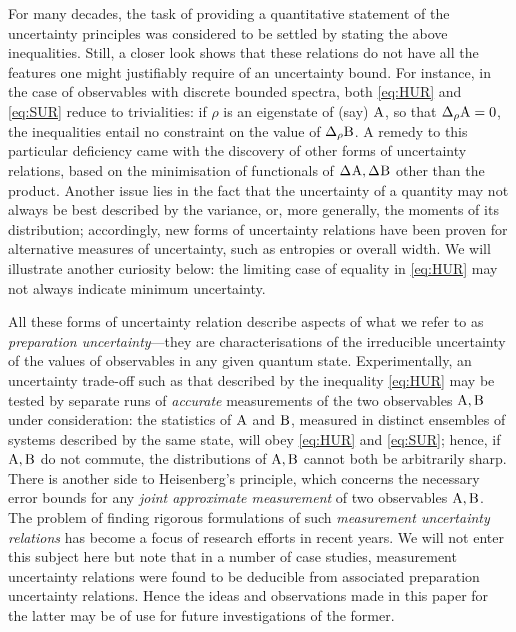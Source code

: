 For many decades, the task of providing a quantitative statement of the uncertainty principles was considered to be settled by stating the above inequalities.
Still, a closer look shows that these relations do not have all the features one might justifiably require of an uncertainty bound. For instance, in the case of observables with discrete bounded spectra, both \eqref{eq:HUR} and \eqref{eq:SUR} reduce to trivialities: if $\rho$ is an eigenstate of (say) $\operatorname{A}$, so that $\sdevr{\opa}=0$, the inequalities entail no constraint on the value of $\sdevr{\opb}$. A remedy to this particular deficiency came with the discovery of other forms of uncertainty relations, based on the minimisation of functionals of $\sdev{\opa}, \sdev{\opb}$ other than the product\cite{Pati,physRevA.86.024101}. Another issue lies in the fact that the uncertainty of a quantity may not always be best described by the variance, or, more generally, the moments of its distribution; accordingly, new forms of uncertainty relations have been proven for alternative measures of uncertainty, such as entropies\cite{birbil,deutsch-entropic-ur,maassen-uffink-entropic-ur} or overall width\cite{UH}. We will illustrate another curiosity below: the limiting case of equality in \eqref{eq:HUR} may not always indicate minimum uncertainty.

All these forms of uncertainty relation describe aspects of what we refer to as {\em preparation uncertainty}---they are characterisations of the irreducible uncertainty of the values of observables in any given quantum state. Experimentally, an uncertainty trade-off such as that described by the inequality \eqref{eq:HUR} may be tested by separate runs of {\em accurate} measurements of the two observables $\operatorname{A},\operatorname{B}$ under consideration: the statistics of $\operatorname{A}$ and $\operatorname{B}$, measured in distinct ensembles of systems described by the same state, will obey \eqref{eq:HUR} and \eqref{eq:SUR}; hence, if $\operatorname{A},\operatorname{B}$ do not commute, the distributions of $\operatorname{A},\operatorname{B}$ cannot both be arbitrarily sharp.
There is another side to Heisenberg's principle, which concerns the necessary error bounds for any {\em joint approximate measurement} of two observables $\operatorname{A},\operatorname{B}$. The problem of finding rigorous formulations of such {\em measurement uncertainty relations} has become a focus of research efforts in recent years\cite{BLW-coll}. We will not enter this subject here but note that  in a number of case studies, measurement uncertainty relations were found to be deducible from associated preparation uncertainty relations. Hence the ideas and observations made in this paper for the latter may be of use for future investigations of the former.

